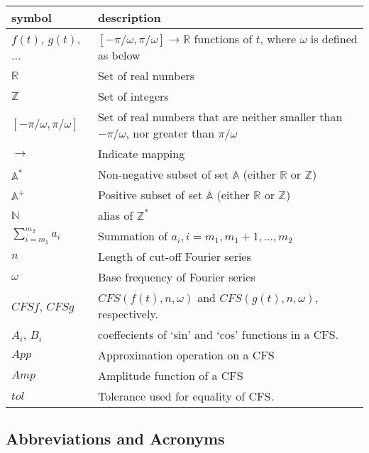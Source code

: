 \documentclass[12pt]{article}
\begin{document}
\renewcommand{\arraystretch}{1.2}
\noindent \begin{longtable*}{l l} \toprule
	\textbf{symbol} & \textbf{description}\\
	\midrule 
	$f(t)$, $g(t)$, ... & $[-\pi/\omega, \pi/\omega]\rightarrow\mathbb{R}$ 
	functions of $t$, where $\omega$ is defined as below\\
	$\mathbb{R}$ & Set of real numbers\\
	$\mathbb{Z}$ & Set of integers\\
	$[-\pi/\omega, \pi/\omega]$ & Set of real numbers that are neither smaller 
	than $-\pi/\omega$, nor greater than $\pi/\omega$ \\
	$\rightarrow$ & Indicate mapping\\
	$\mathbb{A}^{*}$ & Non-negative subset of set $\mathbb{A}$ (either $\mathbb{R}$ 
	or $\mathbb{Z}$)\\
	$\mathbb{A}^{+}$ & Positive subset of set $\mathbb{A}$ (either $\mathbb{R}$ 
	or $\mathbb{Z}$)\\
	$\mathbb{N}$ & alias of $\mathbb{Z}^{*}$\\
	$\sum_{i=m_1}^{m_2}a_i$ & Summation of $a_i, i=m_1, m_1+1, ..., m_2$\\
	$n$ & Length of cut-off Fourier series\\ 
	$\omega$ & Base frequency of Fourier series \\
	$\mathit{CFSf}$, $\mathit{CFSg}$ & $\mathit{CFS}(f(t), n, \omega)$ and 
	$\mathit{CFS}(g(t), n, \omega)$, respectively.\\
	$A_i$, $B_i$& coeffecients of `sin' and `cos' functions in a CFS.\\
	$\mathit{App}$& Approximation operation on a CFS\\
	$\mathit{Amp}$& Amplitude function of a CFS\\
	$\mathit{tol}$& Tolerance used for equality of CFS.\\
	\bottomrule
\end{longtable*}

\subsection{Abbreviations and Acronyms}
\end{document}
